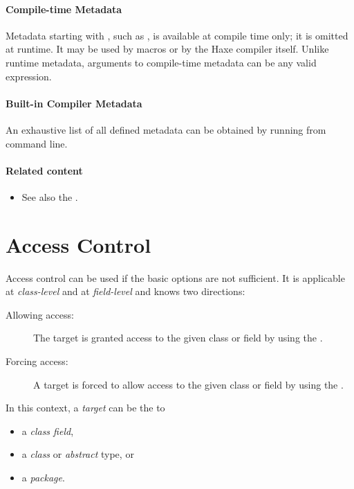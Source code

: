 \paragraph{Compile-time Metadata}

Metadata starting with \expr{:}, such as , is available at compile time only; it is omitted at runtime. It may be used by macros or by the Haxe compiler itself. Unlike runtime metadata, arguments to compile-time metadata can be any valid expression.

\paragraph{Built-in Compiler Metadata}
An exhaustive list of all defined metadata can be obtained by running  from command line.


\paragraph{Related content}
\begin{itemize}
	\item See also the .
\end{itemize}


\section{Access Control}
\label{lf-access-control}

Access control can be used if the basic  options are not sufficient. It is applicable at \emph{class-level} and at \emph{field-level} and knows two directions:

\begin{description}
	\item[Allowing access:] The target is granted access to the given class or field by using the  .
	\item[Forcing access:] A target is forced to allow access to the given class or field by using the  .
\end{description}

In this context, a \emph{target} can be the  to

\begin{itemize}
	\item a \emph{class field},
	\item a \emph{class} or \emph{abstract} type, or
	\item a \emph{package}.
\end{itemize}

